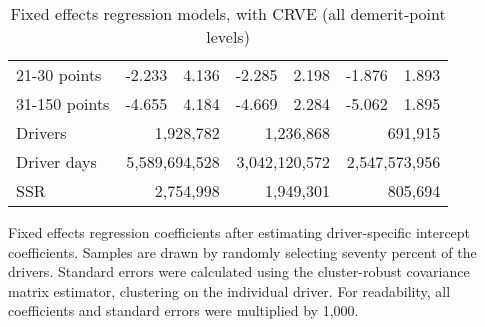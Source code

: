 \begin{table}
\begin{tabular}{l r r r r r r}
21-30 points  & -2.233  &  4.136  & -2.285  &  2.198  & -1.876  &  1.893   \\ 
 
31-150 points  & -4.655  &  4.184  & -4.669  &  2.284  & -5.062  &  1.895   \\ 
 

\hline 
 

Drivers 
 & \multicolumn{2}{r}{1,928,782}  & \multicolumn{2}{r}{1,236,868}  & \multicolumn{2}{r}{691,915}   \\ 
 

Driver days 
 & \multicolumn{2}{r}{5,589,694,528}  & \multicolumn{2}{r}{3,042,120,572}  & \multicolumn{2}{r}{2,547,573,956}   \\ 
 

SSR 
 & \multicolumn{2}{r}{2,754,998}  & \multicolumn{2}{r}{1,949,301}  & \multicolumn{2}{r}{805,694}   \\ 
 

\hline 
 
\end{tabular} 
\caption{Fixed effects regression models, with CRVE (all demerit-point levels)} 
Fixed effects regression coefficients after estimating driver-specific intercept coefficients. 
Samples are drawn by randomly selecting seventy percent of the drivers. 
Standard errors were calculated using the cluster-robust covariance matrix estimator, 
clustering on the individual driver. 
For readability, all coefficients and standard errors were multiplied by 1,000.
\label{tab:FE_regs_CRVE_all_pts} 
\end{table} 
 

